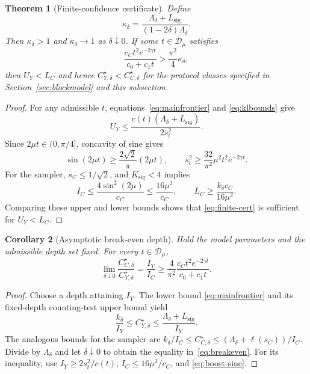\documentclass[11pt,a4paper]{article}
\newtheorem{theorem}{Theorem}[section]
\newtheorem{corollary}[theorem]{Corollary}
\theoremstyle{definition}
\theoremstyle{remark}
\numberwithin{equation}{section}
\begin{document}
\begin{theorem}[Finite-confidence certificate]\label{thm:finite-cert}
Define
\begin{equation}\label{eq:kappa}
\kappa_\delta=\frac{\Lambda_\delta+L_{\mathrm{sig}}}{(1-2\delta)\Lambda_\delta}.
\end{equation}
Then $\kappa_\delta>1$ and $\kappa_\delta\to1$ as $\delta\downarrow 0$.
If some $t\in\mathcal D_\mu$ satisfies
\begin{equation}\label{eq:finite-cert}
\frac{c_Ct^2e^{-2\gamma t}}{c_0+c_1t}
>\frac{\pi^2}{4}\kappa_\delta,
\end{equation}
then $U_Y<L_C$ and hence $C^\star_{Y,\delta}<C^\star_{C,\delta}$ for the
protocol classes specified in Section~\ref{sec:blockmodel} and this subsection.
\end{theorem}
\begin{proof}
For any admissible $t$, equations~\eqref{eq:mainfrontier} and
\eqref{eq:klbounds} give
\[
U_Y\le\frac{c(t)(\Lambda_\delta+L_{\mathrm{sig}})}{2s_t^2}.
\]
Since $2\mu t\in(0,\pi/4]$, concavity of sine gives
\begin{equation}\label{eq:boost-sine}
\sin(2\mu t)\ge\frac{2\sqrt2}{\pi}(2\mu t),\qquad
s_t^2\ge\frac{32}{\pi^2}\mu^2t^2e^{-2\gamma t}.
\end{equation}
For the sampler, $s_C\le1/\sqrt2$, and $K_{\mathrm{sig}}<4$ implies
\[
I_C\le\frac{4\sin^2(2\mu)}{c_C}
\le\frac{16\mu^2}{c_C},\qquad
L_C\ge\frac{k_\delta c_C}{16\mu^2}.
\]
Comparing these upper and lower bounds shows that
\eqref{eq:finite-cert} is sufficient for $U_Y<L_C$.
\end{proof}

\begin{corollary}[Asymptotic break-even depth]\label{cor:breakeven}
Hold the model parameters and the admissible depth set fixed. For every
$t\in\mathcal D_\mu$,
\begin{equation}\label{eq:breakeven}
\lim_{\delta\downarrow 0}
\frac{C^\star_{C,\delta}}{C^\star_{Y,\delta}}
=\frac{I_Y}{I_C}
\ge\frac4{\pi^2}\frac{c_Ct^2e^{-2\gamma t}}{c_0+c_1t}.
\end{equation}
\end{corollary}
\begin{proof}
Choose a depth attaining $I_Y$. The lower bound
\eqref{eq:mainfrontier} and its fixed-depth counting-test upper bound yield
\[
\frac{k_\delta}{I_Y}\le C^\star_{Y,\delta}
\le\frac{\Lambda_\delta+L_{\mathrm{sig}}}{I_Y}.
\]
The analogous bounds for the sampler are
$k_\delta/I_C\le C^\star_{C,\delta}\le(\Lambda_\delta+\ell(s_C))/I_C$.
Divide by $\Lambda_\delta$ and let $\delta\downarrow 0$ to obtain the equality
in~\eqref{eq:breakeven}. For its inequality, use
$I_Y\ge2s_t^2/c(t)$, $I_C\le16\mu^2/c_C$, and
\eqref{eq:boost-sine}.
\end{proof}
\end{document}
